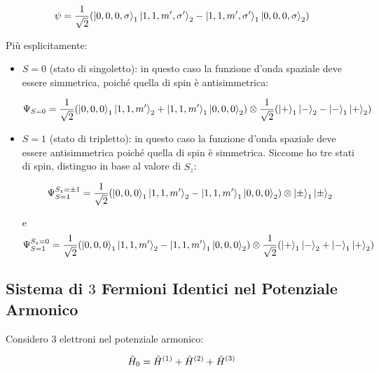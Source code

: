 \begin{itemize}
	\begin{align*}
		\psi = \frac{1}{\sqrt{2}} \qty( \ket{0, 0, 0, \sigma}_1 \ket{1, 1, m', \sigma'}_2 -  \ket{1, 1, m', \sigma'}_1 \ket{0, 0, 0, \sigma}_2 )
	\end{align*}
	
		Più esplicitamente:
		
	\begin{itemize}
	
		\item $S = 0$ (stato di singoletto): in questo caso la funzione d'onda spaziale deve essere simmetrica, poiché quella di spin è antisimmetrica:
		
		\begin{align*}
			\Psi_{S = 0} = \frac{1}{\sqrt{2}} \qty(\ket{0, 0, 0}_1 \ket{1, 1, m'}_2 + \ket{1, 1, m'}_1 \ket{0, 0, 0}_2) \otimes \frac{1}{\sqrt{2}} \qty(\ket{+}_1 \ket{-}_2 - \ket{-}_1 \ket{+}_2)
		\end{align*}
		
		\item $S = 1$ (stato di tripletto): in questo caso la funzione d'onda spaziale deve essere antisimmetrica poiché quella di spin è simmetrica. Siccome ho tre stati di spin, distinguo in base al valore di $\hat{S}_z$:
		
		\begin{align*}
			\Psi_{S = 1}^{S_z = \pm 1} = \frac{1}{\sqrt{2}} \qty(\ket{0, 0, 0}_1 \ket{1, 1, m'}_2 - \ket{1, 1, m'}_1 \ket{0, 0, 0}_2) \otimes \ket{\pm}_1 \ket{\pm}_2
		\end{align*}
		
			e
		\begin{align*}
			\Psi_{S = 1}^{S_z = 0} = \frac{1}{\sqrt{2}} \qty(\ket{0, 0, 0}_1 \ket{1, 1, m'}_2 - \ket{1, 1, m'}_1 \ket{0, 0, 0}_2) \otimes  \frac{1}{\sqrt{2}} \qty(\ket{+}_1 \ket{-}_2 + \ket{-}_1 \ket{+}_2)
		\end{align*}
	\end{itemize}
\end{itemize}

\subsection{Sistema di $3$ Fermioni Identici nel Potenziale Armonico}
	
	Considero $3$ elettroni nel potenziale armonico:
	
\begin{align*}	
	\hat{H}_0 = \hat{H}^{\qty(1)} + \hat{H}^{\qty(2)} + \hat{H}^{\qty(3)}
\end{align*}


